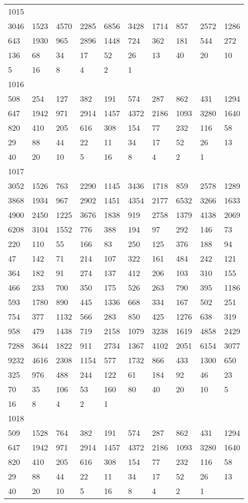 \begin{longtable}{*{10}{l}}
1015&&&&&&&&&\\
3046& 1523& 4570& 2285& 6856& 3428& 1714& 857& 2572& 1286\\
643& 1930& 965& 2896& 1448& 724& 362& 181& 544& 272\\
136& 68& 34& 17& 52& 26& 13& 40& 20& 10\\
5& 16& 8& 4& 2& 1& \\

1016&&&&&&&&&\\
508& 254& 127& 382& 191& 574& 287& 862& 431& 1294\\
647& 1942& 971& 2914& 1457& 4372& 2186& 1093& 3280& 1640\\
820& 410& 205& 616& 308& 154& 77& 232& 116& 58\\
29& 88& 44& 22& 11& 34& 17& 52& 26& 13\\
40& 20& 10& 5& 16& 8& 4& 2& 1& \\

1017&&&&&&&&&\\
3052& 1526& 763& 2290& 1145& 3436& 1718& 859& 2578& 1289\\
3868& 1934& 967& 2902& 1451& 4354& 2177& 6532& 3266& 1633\\
4900& 2450& 1225& 3676& 1838& 919& 2758& 1379& 4138& 2069\\
6208& 3104& 1552& 776& 388& 194& 97& 292& 146& 73\\
220& 110& 55& 166& 83& 250& 125& 376& 188& 94\\
47& 142& 71& 214& 107& 322& 161& 484& 242& 121\\
364& 182& 91& 274& 137& 412& 206& 103& 310& 155\\
466& 233& 700& 350& 175& 526& 263& 790& 395& 1186\\
593& 1780& 890& 445& 1336& 668& 334& 167& 502& 251\\
754& 377& 1132& 566& 283& 850& 425& 1276& 638& 319\\
958& 479& 1438& 719& 2158& 1079& 3238& 1619& 4858& 2429\\
7288& 3644& 1822& 911& 2734& 1367& 4102& 2051& 6154& 3077\\
9232& 4616& 2308& 1154& 577& 1732& 866& 433& 1300& 650\\
325& 976& 488& 244& 122& 61& 184& 92& 46& 23\\
70& 35& 106& 53& 160& 80& 40& 20& 10& 5\\
16& 8& 4& 2& 1& \\

1018&&&&&&&&&\\
509& 1528& 764& 382& 191& 574& 287& 862& 431& 1294\\
647& 1942& 971& 2914& 1457& 4372& 2186& 1093& 3280& 1640\\
820& 410& 205& 616& 308& 154& 77& 232& 116& 58\\
29& 88& 44& 22& 11& 34& 17& 52& 26& 13\\
40& 20& 10& 5& 16& 8& 4& 2& 1& \\


\end{longtable}
